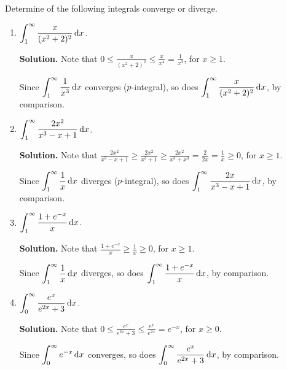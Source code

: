 \begin{Example}{}{}
    Determine of the following integrals converge or diverge.
    \begin{enumerate}[label=(\roman*)]
        \item $ \displaystyle \int_{1}^{\infty} \frac{x}{(x^2+2)^2}\odif{x} $.

            \textbf{Solution.} Note that
            $ \displaystyle  0\leqslant \frac{x}{(x^2+2)^2}\leqslant \frac{x}{x^4}=\frac{1}{x^3} $,
            for $ x\geqslant 1 $.

            Since $ \displaystyle \int_{1}^{\infty} \frac{1}{x^3} \odif{x}  $
            converges ($ p $-integral), so does $ \displaystyle \int_{1}^{\infty} \frac{x}{(x^2+2)^2} \odif{x} $,
            by comparison.
        \item $ \displaystyle \int_{1}^{\infty} \frac{2x^2}{x^3-x+1} \odif{x}  $.

            \textbf{Solution.} Note that
            $ \displaystyle \frac{2x^2}{x^3-x+1} \geqslant \frac{2x^2}{x^3+1} \geqslant \frac{2x^2}{x^3+x^3}=
            \frac{2}{2x} =\frac{1}{x}\geqslant 0 $,
            for $ x\geqslant 1 $.

            Since $ \displaystyle \int_{1}^{\infty} \frac{1}{x} \odif{x}  $
            diverges ($ p $-integral), so does $ \displaystyle \int_{1}^{\infty} \frac{2x}{x^3-x+1} \odif{x} $,
            by comparison.
        \item $ \displaystyle \int_{1}^{\infty} \frac{1+e^{-x}}{x} \odif{x} $.

            \textbf{Solution.} Note that
            $ \displaystyle \frac{1+e^{-x}}{x} \geqslant \frac{1}{x} \geqslant 0 $,
            for $ x\geqslant 1 $.

            Since $ \displaystyle \int_{1}^{\infty} \frac{1}{x} \odif{x}  $ diverges,
            so does $ \displaystyle \int_{1}^{\infty} \frac{1+e^{-x}}{x} \odif{x}  $, by comparison.
        \item $ \displaystyle \int_{0}^{\infty} \frac{e^x}{e^{2x}+3} \odif{x}  $.

            \textbf{Solution.} Note that
            $ \displaystyle  0\leqslant \frac{e^{x}}{e^{2x}+3} \leqslant \frac{e^{x}}{e^{2x}} =e^{-x} $,
            for $ x\geqslant 0 $.

            Since $ \displaystyle \int_{0}^{\infty} e^{-x}\odif{x}  $ converges,
            so does $ \displaystyle \int_{0}^{\infty} \frac{e^{x}}{e^{2x}+3} \odif{x}  $, by comparison.
    \end{enumerate}
\end{Example}

